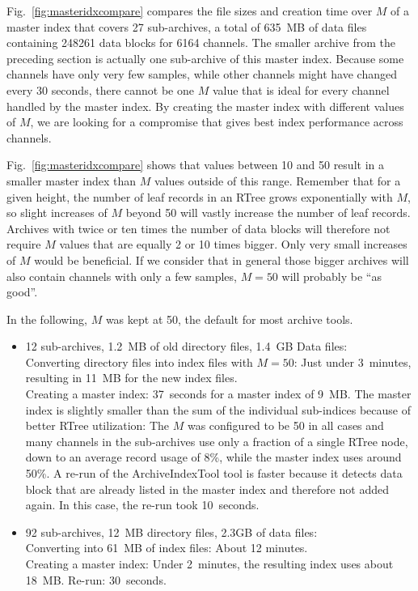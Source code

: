 Fig.\ \ref{fig:masteridxcompare} compares the file sizes and creation
time over $M$ of a master index that covers 27 sub-archives, a total
of 635~MB of data files containing 248261 data blocks for 6164
channels.  The smaller archive from the preceding section is actually
one sub-archive of this master index. Because some channels have only
very few samples, while other channels might have changed every 30
seconds, there cannot be one $M$ value that is ideal for every
channel handled by the master index. By creating the master index with
different values of $M$, we are looking for a compromise that gives
best index performance across channels.

Fig.\ \ref{fig:masteridxcompare} shows
that values between 10 and 50 result in a smaller master index than
$M$ values outside of this range. Remember that for a given height,
the number of leaf records in an RTree grows exponentially with $M$,
so slight increases of $M$ beyond 50 will vastly increase the number
of leaf records. Archives with twice or ten times the number of data
blocks will therefore not require $M$ values that are equally 2 or 10 times
bigger. Only very small increases of $M$ would be beneficial. If we
consider that in general those bigger archives will also contain
channels with only a few samples, $M=50$ will probably be ``as good''.

In the following, $M$ was kept at 50, the default for most archive tools.
\begin{itemize}
\item 12 sub-archives, 1.2~MB of old directory files, 1.4~GB Data
      files:\\
      Converting directory files into index files with $M=50$:
      Just under 3~minutes, resulting in 11~MB for the new index files.\\
      Creating a master index: 37~seconds for a master index of 9~MB.
      The master index is slightly smaller than the sum of the
      individual sub-indices because of better RTree utilization:
      The $M$ was configured to be 50 in all cases and many channels
      in the sub-archives use only a fraction of a single RTree
      node, down to an average record usage of 8\%, while the master
      index uses around 50\%.
      A re-run of the ArchiveIndexTool tool is faster because
      it detects data block that are already listed in the master index and
      therefore not added again. In this case, the re-run took 10~seconds.
\item 92 sub-archives, 12~MB directory files, 2.3GB of data files:\\
      Converting into 61~MB of index files: About 12 minutes.\\
      Creating a master index: Under 2~minutes, the resulting
      index uses about 18~MB.
      Re-run: 30~seconds.
\end{itemize}

